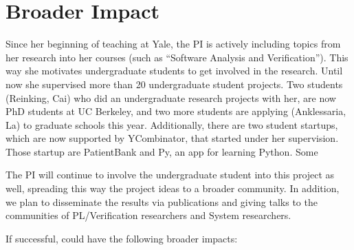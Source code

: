 
\section{Broader Impact}

Since her beginning of teaching at Yale, the PI is actively including topics from her 
research into her courses (such as ``Software Analysis and Verification''). This way
she motivates undergraduate students to get involved in the research. Until now 
she supervised more than 20 undergraduate student projects. Two students (Reinking, Cai) 
who did an undergraduate research projects with her, are now PhD students at 
UC Berkeley, and two more students are applying (Anklessaria, La) to graduate schools 
this year. Additionally, there are two student startups, which are now supported
by YCombinator, that started under her supervision. Those startup are PatientBank
and Py, an app for learning Python. Some

The PI will continue to involve the undergraduate student into 
this project as well, spreading this way the project ideas to a broader community.
In addition, we plan to disseminate the results via publications and giving talks 
to the communities of PL/Verification researchers and System researchers.


If successful, \app could have the following broader impacts:

